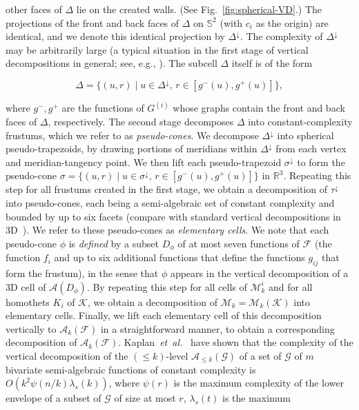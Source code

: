 \documentclass[11pt]{article}
\newif\ifsocgproc
\def\reals{{\mathbb R}}
\def\sphere{{\mathbb S}}
\def\A{\mathcal{A}}
\def\F{\mathcal{F}}
\def\G{\mathcal{G}}
\def\K{\mathcal{K}}
\def\M{\mathcal{M}}
\def\cell{\tau}
\def\Ak#1{\A_{{\le}#1}}
\def\etal{\textsl{et~al.}}
\theoremstyle{definition}
\begin{document}
other faces  of $\Delta$ lie on the created walls. (See Fig.~\ref{fig:spherical-VD}.) 
The projections of the front and back 
faces of $\Delta$ on $\sphere^2$ (with $c_i$ as the origin) are identical, and we denote 
this identical projection by $\Delta^\downarrow$. The complexity of $\Delta^\downarrow$ 
may be arbitrarily large (a typical situation in the first stage of vertical decompositions
in general; see, e.g., \cite{CEGS}). The subcell $\Delta$ itself is of the form 
\ifsocgproc
$\Delta = \{ (u,r) \mid u \in \Delta^\downarrow,\, r\in [g^-(u),g^+(u)] \}$,
\else
\[ 
\Delta = \{ (u,r) \mid u \in \Delta^\downarrow,\, r\in [g^-(u),g^+(u)] \} ,
\]
\fi
where $g^-, g^+$ are the functions of $G^{(i)}$ whose graphs contain the front and back faces of $\Delta$,
respectively. 
%
The second stage decomposes $\Delta$ into constant-complexity frustums, which we refer to as 
\emph{pseudo-cones}. We decompose $\Delta^\downarrow$ into spherical pseudo-trapezoids,
by drawing portions of meridians within $\Delta^\downarrow$ from each vertex and meridian-tangency 
point. We then lift each pseudo-trapezoid $\sigma^\downarrow$ to form the pseudo-cone 
$\sigma = \{ (u,r) \mid u \in \sigma^\downarrow, \, r \in [g^-(u),g^+(u)] \}$ in $\reals^3$.
%
Repeating this step for all frustums created in the first stage, we obtain
a decomposition of $\cell^\downarrow$ into pseudo-cones,
each being a semi-algebraic set of constant complexity and bounded by up to six facets
(compare with standard vertical decompositions in 3D~\cite{CEGS}). 
We refer to these pseudo-cones as \emph{elementary cells}. We note that each pseudo-cone 
$\phi$ is \emph{defined} by a subset $D_\phi$ of at most seven functions of $\F$ (the function $f_i$
and up to six additional functions that define the functions $g_{ij}$ that form the frustum), 
in the sense that $\phi$ appears in the vertical decomposition of a 3D cell of $\A(D_\phi)$.
By repeating this step for all cells of $\M_k^i$ and for all homothets $K_i$ of $\K$, 
we obtain a decomposition of $\M_k = \M_k(\K)$ into elementary cells. Finally, we 
lift each elementary cell of this decomposition vertically to $\A_k(\F)$ in a straightforward manner,
to obtain a corresponding decomposition of $\A_k(\F)$.
%
Kaplan~\etal~\cite[Lemma~6.2]{KMRSS} have shown that the complexity of the vertical decomposition of 
the $(\le k)$-level $\Ak{k}(\G)$ of a set of $\G$ of $m$ bivariate semi-algebraic functions of constant 
complexity is $O(k^2\psi(n/k)\lambda_s(k))$, where $\psi(r)$ is the maximum complexity of 
the lower envelope of a subset of $\G$ of size at most $r$, $\lambda_s(t)$ is the maximum 
\end{document}
